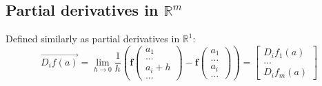 \documentclass{article}
\begin{document}
\subsection{Partial derivatives in $\mathbb{R}^m$}
Defined similarly as partial derivatives in $\mathbb{R}^1$:
\begin{equation*}
    \overrightarrow{D_if(a)} = \lim_{h\rightarrow 0}\frac{1}{h}\left(
        \mathbf{f}\begin{pmatrix}
            a_1\\
            ...\\
            a_i + h\\
            ...
        \end{pmatrix} -
        \mathbf{f}\begin{pmatrix}
            a_1\\
            ...\\
            a_i\\
            ...
        \end{pmatrix}
    \right) = \begin{bmatrix}
        D_if_1(a)\\
        ...\\
        D_if_m(a)
    \end{bmatrix}
\end{equation*}
\end{document}
